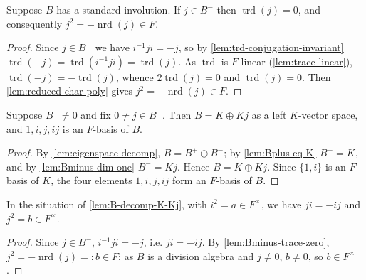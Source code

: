 \begin{lemma}
    \label{lem:Bminus-trace-zero}
    Suppose $B$ has a standard involution. If $j \in B^{-}$ then
    $\operatorname{trd}(j) = 0$, and consequently $j^2 = -\operatorname{nrd}(j) \in
    F$.
\end{lemma}
\begin{proof}
    Since $j \in B^{-}$ we have $i^{-1}ji = -j$, so by
    \ref{lem:trd-conjugation-invariant} $\operatorname{trd}(-j) =
    \operatorname{trd}(i^{-1}ji) = \operatorname{trd}(j)$. As $\operatorname{trd}$
    is $F$-linear (\ref{lem:trace-linear}), $\operatorname{trd}(-j) =
    -\operatorname{trd}(j)$, whence $2\operatorname{trd}(j) = 0$ and
    $\operatorname{trd}(j) = 0$. Then \ref{lem:reduced-char-poly} gives $j^2 =
    -\operatorname{nrd}(j) \in F$.
\end{proof}

\begin{lemma}[Decomposition $B = K \oplus Kj$]
    \label{lem:B-decomp-K-Kj}
    Suppose $B^{-} \neq 0$ and fix $0 \neq j \in B^{-}$. Then $B = K \oplus Kj$ as a
    left $K$-vector space, and $1, i, j, ij$ is an $F$-basis of $B$.
\end{lemma}
\begin{proof}
    By \ref{lem:eigenspace-decomp}, $B = B^{+} \oplus B^{-}$; by
    \ref{lem:Bplus-eq-K} $B^{+} = K$, and by \ref{lem:Bminus-dim-one} $B^{-} = Kj$.
    Hence $B = K \oplus Kj$. Since $\{1, i\}$ is an $F$-basis of $K$, the four
    elements $1, i, j, ij$ form an $F$-basis of $B$.
\end{proof}

\begin{lemma}
    \label{lem:quaternion-relations}
    In the situation of \ref{lem:B-decomp-K-Kj}, with $i^2 = a \in F^\times$, we
    have $ji = -ij$ and $j^2 = b \in F^\times$.
\end{lemma}
\begin{proof}
    Since $j \in B^{-}$, $i^{-1}ji = -j$, i.e. $ji = -ij$. By
    \ref{lem:Bminus-trace-zero}, $j^2 = -\operatorname{nrd}(j) =: b \in F$; as $B$
    is a division algebra and $j \neq 0$, $b \neq 0$, so $b \in F^\times$.
\end{proof}

